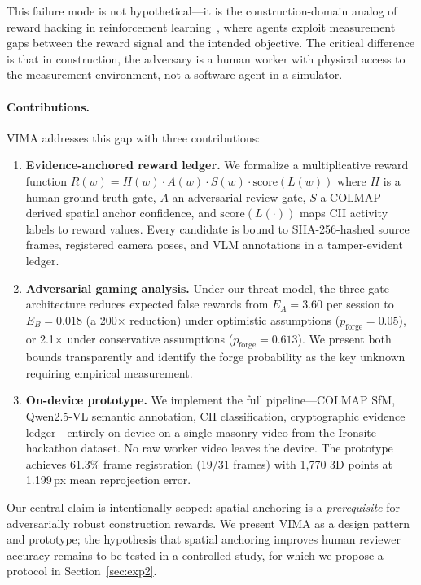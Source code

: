 \documentclass[sigconf,nonacm]{acmart}
\begin{document}
This failure mode is not hypothetical---it is the construction-domain analog of reward hacking in reinforcement learning~\cite{rewardhacking}, where agents exploit measurement gaps between the reward signal and the intended objective.
The critical difference is that in construction, the adversary is a human worker with physical access to the measurement environment, not a software agent in a simulator.

\paragraph{Contributions.}
VIMA addresses this gap with three contributions:
\begin{enumerate}[leftmargin=1.4em,itemsep=0.2em]
\item \textbf{Evidence-anchored reward ledger.} We formalize a multiplicative reward function $R(w) = H(w) \cdot A(w) \cdot S(w) \cdot \mathrm{score}(L(w))$ where $H$ is a human ground-truth gate, $A$ an adversarial review gate, $S$ a COLMAP-derived spatial anchor confidence, and $\mathrm{score}(L(\cdot))$ maps CII activity labels to reward values.
Every candidate is bound to SHA-256-hashed source frames, registered camera poses, and VLM annotations in a tamper-evident ledger.

\item \textbf{Adversarial gaming analysis.} Under our threat model, the three-gate architecture reduces expected false rewards from $E_A = 3.60$ per session to $E_B = 0.018$ (a 200$\times$ reduction) under optimistic assumptions ($p_{\mathrm{forge}} = 0.05$), or 2.1$\times$ under conservative assumptions ($p_{\mathrm{forge}} = 0.613$). We present both bounds transparently and identify the forge probability as the key unknown requiring empirical measurement.

\item \textbf{On-device prototype.} We implement the full pipeline---COLMAP SfM, Qwen2.5-VL semantic annotation, CII classification, cryptographic evidence ledger---entirely on-device on a single masonry video from the Ironsite hackathon dataset.
No raw worker video leaves the device.
The prototype achieves 61.3\% frame registration (19/31 frames) with 1,770 3D points at 1.199\,px mean reprojection error.
\end{enumerate}

Our central claim is intentionally scoped: spatial anchoring is a \emph{prerequisite} for adversarially robust construction rewards.
We present VIMA as a design pattern and prototype; the hypothesis that spatial anchoring improves human reviewer accuracy remains to be tested in a controlled study, for which we propose a protocol in Section~\ref{sec:exp2}.
\end{document}
